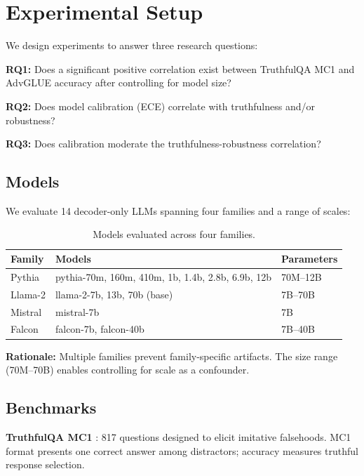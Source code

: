 \section{Experimental Setup}
\label{sec:experiments}

We design experiments to answer three research questions:

\textbf{RQ1:} Does a significant positive correlation exist between TruthfulQA MC1 and AdvGLUE accuracy after controlling for model size?

\textbf{RQ2:} Does model calibration (ECE) correlate with truthfulness and/or robustness?

\textbf{RQ3:} Does calibration moderate the truthfulness-robustness correlation?

\subsection{Models}

We evaluate 14 decoder-only LLMs spanning four families and a range of scales:

\begin{table}[h]
\centering
\begin{tabular}{lll}
\toprule
\textbf{Family} & \textbf{Models} & \textbf{Parameters} \\
\midrule
Pythia & pythia-70m, 160m, 410m, 1b, 1.4b, 2.8b, 6.9b, 12b & 70M--12B \\
Llama-2 & llama-2-7b, 13b, 70b (base) & 7B--70B \\
Mistral & mistral-7b & 7B \\
Falcon & falcon-7b, falcon-40b & 7B--40B \\
\bottomrule
\end{tabular}
\caption{Models evaluated across four families.}
\label{tab:models}
\end{table}

\textbf{Rationale:} Multiple families prevent family-specific artifacts. The size range (70M--70B) enables controlling for scale as a confounder.

\subsection{Benchmarks}

\textbf{TruthfulQA MC1} \cite{lin2022truthfulqa}: 817 questions designed to elicit imitative falsehoods. MC1 format presents one correct answer among distractors; accuracy measures truthful response selection.

